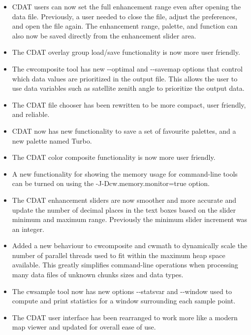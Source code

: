 \begin{itemize}
\item CDAT users can now set the full enhancement range even after opening
the data file.  Previously, a user needed to close the file, adjust the 
preferences, and open the file again.  The enhancement range, palette, 
and function can also now be saved directly from the enhancement slider area.

\item The CDAT overlay group load/save functionality is now more user 
friendly.

\item The cwcomposite tool has new -{-}optimal and -{-}savemap options 
that control which data values are prioritized in the output file.  This allows
the user to use data variables such as satellite zenith angle to prioritize
the output data.

\item The CDAT file chooser has been rewritten to be more compact, user 
friendly, and reliable.

\item CDAT now has new functionality to save a set of favourite palettes, 
and a new palette named Turbo.

\item The CDAT color composite functionality is now more user friendly.

\item A new functionality for showing the memory usage for command-line tools 
can be turned on using the -J-Dcw.memory.monitor=true option.

\item The CDAT enhancement sliders are now smoother and more accurate and 
update the number of decimal places in the text boxes based on the slider 
minimum and maximum range.  Previously the minimum slider increment was an 
integer.

\item Added a new behaviour to cwcomposite and cwmath to dynamically scale
the number of parallel threads used to fit within the maximum heap space
available.  This greatly simplifies command-line operations when processing
many data files of unknown chunks sizes and data types.

\item The cwsample tool now has new options -{-}statsvar and -{-}window 
used to compute and print statistics for a window surrounding each
sample point.

\item The CDAT user interface has been rearranged to work more like a modern
map viewer and updated for overall ease of use.

\end{itemize}

